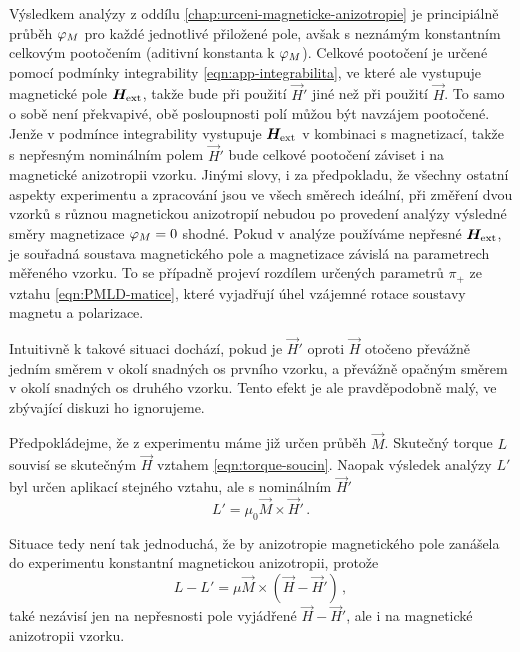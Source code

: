 Výsledkem analýzy z oddílu \ref{chap:urceni-magneticke-anizotropie} je principiálně průběh $\varphi_M$ pro každé jednotlivé přiložené pole, avšak s neznámým konstantním celkovým pootočením (aditivní konstanta k $\varphi_M$).
Celkové pootočení je určené pomocí podmínky integrability \eqref{eqn:app-integrabilita}, ve které ale vystupuje magnetické pole $\bm{H}_\textrm{ext}$, takže bude při použití $\vec{H}'$ jiné než při použití $\vec{H}$.
To samo o sobě není překvapivé, obě posloupnosti polí můžou být navzájem pootočené.
Jenže v podmínce integrability vystupuje $\bm{H}_\textrm{ext}$ v kombinaci s magnetizací, takže s nepřesným nominálním polem $\vec{H}'$ bude celkové pootočení záviset i na magnetické anizotropii vzorku.
Jinými slovy, i za předpokladu, že všechny ostatní aspekty experimentu a zpracování jsou ve všech směrech ideální, při změření dvou vzorků s různou magnetickou anizotropií nebudou po provedení analýzy výsledné směry magnetizace $\varphi_M=0$ shodné.
Pokud v analýze používáme nepřesné $\bm{H}_\textrm{ext}$, je souřadná soustava magnetického pole a magnetizace závislá na parametrech měřeného vzorku.
To se případně projeví rozdílem určených parametrů $\pi_+$ ze vztahu \eqref{eqn:PMLD-matice}, které vyjadřují úhel vzájemné rotace soustavy magnetu a polarizace.

Intuitivně k takové situaci dochází, pokud je $\vec{H}'$ oproti $\vec{H}$ otočeno převážně jedním směrem v okolí snadných os prvního vzorku, a převážně opačným směrem v okolí snadných os druhého vzorku.
Tento efekt je ale pravděpodobně malý, ve zbývající diskuzi ho ignorujeme.

Předpokládejme, že z experimentu máme již určen průběh $\vec{M}$.
Skutečný torque $L$ souvisí se skutečným $\vec{H}$ vztahem \eqref{eqn:torque-soucin}.
Naopak výsledek analýzy $L'$ byl určen aplikací stejného vztahu, ale s nominálním $\vec{H}'$
\begin{equation}
    L' = \mu_0 \vec{M}\times\vec{H}' \,.
\end{equation}

Situace tedy není tak jednoduchá, že by anizotropie magnetického pole zanášela do experimentu konstantní magnetickou anizotropii, protože
\begin{equation}
    \label{eqn:pridana-anizotropie}
L -L' = \mu \vec{M} \times (\vec{H}-\vec{H}') \,,
\end{equation}
také nezávisí jen na nepřesnosti pole vyjádřené $\vec{H}-\vec{H}'$, ale i na magnetické anizotropii vzorku.
